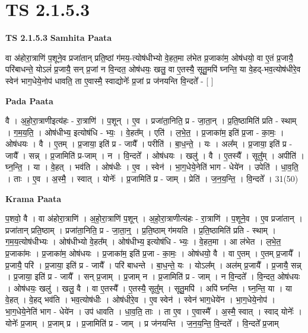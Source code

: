 \documentclass[17pt]{extarticle}
\begin{document}
\section{ TS 2.1.5.3 }

\textbf{TS 2.1.5.3 } \newline
\textbf{Samhita Paata} \newline

वा अ॑होरा॒त्राणि॑ प॒शूने॒व प्रजा॑तान् प्रति॒ष्ठां ग॑मय॒-त्योष॑धीभ्यो वे॒हत॒मा ल॑भेत प्र॒जाका॑म॒ ओष॑धयो॒ वा ए॒तं प्र॒जायै॒ परि॑बाधन्ते॒ योऽलं॑ प्र॒जायै॒ सन् प्र॒जां न वि॒न्दत॒ ओष॑धयः॒ खलु॒ वा ए॒तस्यै॒ सूतु॒मपि॑ घ्नन्ति॒ या वे॒हद्-भव॒त्योष॑धीरे॒व स्वेन॑ भाग॒धेये॒नोप॑ धावति॒ ता ए॒वास्मै॒ स्वाद्योनेः᳚ प्र॒जां प्र ज॑नयन्ति वि॒न्दते᳚ - [  ] \newline

\textbf{Pada Paata} \newline

वै । अ॒हो॒रा॒त्राणीइत्य॑हः - रा॒त्राणि॑ । प॒शून् । ए॒व । प्रजा॑ता॒निति॒ प्र - जा॒ता॒न् । प्र॒ति॒ष्ठामिति॑ प्रति - स्थाम् । ग॒म॒य॒ति॒ । ओष॑धीभ्य॒ इत्योष॑धि - भ्यः॒ । वे॒हत᳚म् । एति॑ । ल॒भे॒त॒ । प्र॒जाका॑म॒ इति॑ प्र॒जा - का॒मः॒ । ओष॑धयः । वै । ए॒तम् । प्र॒जाया॒ इति॑ प्र - जायै᳚ । परीति॑ । बा॒ध॒न्ते॒ । यः । अल᳚म् । प्र॒जाया॒ इति॑ प्र - जायै᳚ । सन्न् । प्र॒जामिति॑ प्र-जाम् । न । वि॒न्दते᳚ । ओष॑धयः । खलु॑ । वै । ए॒तस्यै᳚ । सूतु᳚म् । अपीति॑ । घ्न॒न्ति॒ । या । वे॒हत् । भव॑ति । ओष॑धीः । ए॒व । स्वेन॑ । भा॒ग॒धेये॒नेति॑ भाग - धेये॑न । उपेति॑ । धा॒व॒ति॒ । ताः । ए॒व । अ॒स्मै॒ । स्वात् । योनेः᳚ । प्र॒जामिति॑ प्र - जाम् । प्रेति॑ । ज॒न॒य॒न्ति॒ । वि॒न्दते᳚ । 31(50)  \newline


\textbf{Krama Paata} \newline

प॒शवो॒ वै । वा अ॑होरा॒त्राणि॑ । अ॒हो॒रा॒त्राणि॑ प॒शून् । अ॒हो॒रा॒त्राणीत्य॑हः - रा॒त्राणि॑ । प॒शूने॒व । ए॒व प्रजा॑तान् । प्रजा॑तान् प्रति॒ष्ठाम् । प्रजा॑ता॒निति॒ प्र - जा॒ता॒न्॒ । प्र॒ति॒ष्ठाम् ग॑मयति । प्र॒ति॒ष्ठामिति॑ प्रति - स्थाम् । ग॒म॒य॒त्योष॑धीभ्यः । ओष॑धीभ्यो वे॒हत᳚म् । ओष॑धीभ्य॒ इत्योष॑धि - भ्यः॒ । वे॒हत॒मा । आ ल॑भेत । ल॒भे॒त॒ प्र॒जाका॑मः । प्र॒जाका॑म॒ ओष॑धयः । प्र॒जाका॑म॒ इति॑ प्र॒जा - का॒मः॒ । ओष॑धयो॒ वै । वा ए॒तम् । ए॒तम् प्र॒जायै᳚ । प्र॒जायै॒ परि॑ । प्र॒जाया॒ इति॑ प्र - जायै᳚ । परि॑ बाधन्ते । बा॒ध॒न्ते॒ यः । योऽल᳚म् । अल॑म् प्र॒जायै᳚ । प्र॒जायै॒ सन्न् । प्र॒जाया॒ इति॑ प्र - जायै᳚ । सन् प्र॒जाम् । प्र॒जाम् न । प्र॒जामिति॑ प्र - जाम् । न वि॒न्दते᳚ । वि॒न्दत॒ ओष॑धयः । ओष॑धयः॒ खलु॑ । खलु॒ वै । वा ए॒तस्यै᳚ । ए॒तस्यै॒ सूतु᳚म् । सूतु॒मपि॑ । अपि॑ घ्नन्ति । घ्न॒न्ति॒ या । या वे॒हत् । वे॒हद् भव॑ति । भव॒त्योष॑धीः । ओष॑धीरे॒व । ए॒व स्वेन॑ । स्वेन॑ भाग॒धेये॑न । भा॒ग॒धेये॒नोप॑ । भा॒ग॒धेये॒नेति॑ भाग - धेये॑न । उप॑ धावति । धा॒व॒ति॒ ताः । ता ए॒व । ए॒वास्मै᳚ । अ॒स्मै॒ स्वात् । स्वाद् योनेः᳚ । योनेः᳚ प्र॒जाम् । प्र॒जाम् प्र । प्र॒जामिति॑ प्र - जाम् । प्र ज॑नयन्ति । ज॒न॒य॒न्ति॒ वि॒न्दते᳚ । वि॒न्दते᳚ प्र॒जाम् \newline
\end{document}
